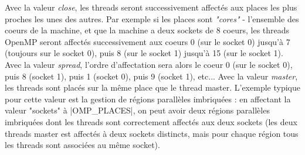 Avec la valeur \emph{close}, les threads seront successivement affectés aux places les plus proches les unes des autres. Par exemple si les places sont \emph{"cores"} - l'ensemble des coeurs de la machine, et que la machine a deux sockets de 8 coeurs, les threads OpenMP seront affectés successivement aux coeurs 0 (sur le socket 0) jusqu'à 7 (toujours sur le socket 0), puis 8 (sur le socket 1) jusqu'à 15 (sur le socket 1).
Avec la valeur \emph{spread}, l'ordre d'affectation sera alors le coeur 0 (sur le socket 0), puis 8 (socket 1), puis 1 (socket 0), puis 9 (socket 1), etc...
Avec la valeur \emph{master}, les threads sont placés sur la même place que le thread master.
L'exemple typique pour cette valeur est la gestion de régions parallèles imbriquées : en affectant la valeur "sockets" à |OMP_PLACES|, on peut avoir deux régions parallèles imbriquées dont les threads sont correctement affectés aux deux sockets (les deux threads master est affectés à deux sockets distincts, mais pour chaque région tous les threads sont associées au même socket).
